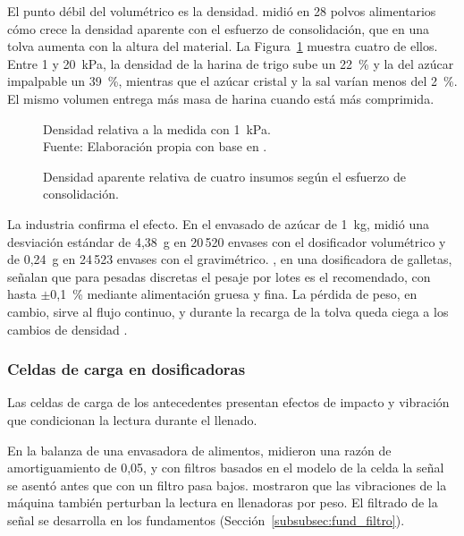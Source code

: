 El punto débil del volumétrico es la densidad.
\textcite{lanzerstorfer2020density} midió en 28 polvos alimentarios cómo crece
la densidad aparente con el esfuerzo de consolidación, que en una tolva
aumenta con la altura del material. La Figura~\ref{fig:densidad_esfuerzo}
muestra cuatro de ellos. Entre 1 y 20~kPa, la densidad de la harina de trigo
sube un 22~\% y la del azúcar impalpable un 39~\%, mientras que el azúcar
cristal y la sal varían menos del 2~\%. El mismo volumen entrega más masa de
harina cuando está más comprimida.

\begin{figure}[H]
    \centering
    \resizebox{0.75\textwidth}{!}{}
    \caption{Densidad aparente relativa de cuatro insumos según el esfuerzo de consolidación.}
    \label{fig:densidad_esfuerzo}
    \vspace{0.2em}
    {\footnotesize Densidad relativa a la medida con 1~kPa.\\
    Fuente: Elaboración propia con base en \textcite{lanzerstorfer2020density}.}
\end{figure}

La industria confirma el efecto. En el envasado de azúcar de 1~kg,
\textcite{acuna2024gravimetrico} midió una desviación estándar de 4,38~g en
20\,520 envases con el dosificador volumétrico y de 0,24~g en 24\,523 envases
con el gravimétrico.
\textcite{chiliguana2016rediseno}, en una dosificadora de galletas, señalan que
para pesadas discretas el pesaje por lotes es el recomendado, con hasta
$\pm$0,1~\% mediante alimentación gruesa y fina. La pérdida de peso, en cambio, sirve al flujo continuo, y
durante la recarga de la tolva queda ciega a los cambios de densidad
\parencite{blackshields2018continuous}.

\subsubsection{Celdas de carga en dosificadoras}
\label{subsec:medicion_celdas}

Las celdas de carga de los antecedentes presentan efectos de impacto y
vibración que condicionan la lectura durante el llenado.

En la balanza de una envasadora de alimentos, \textcite{richiedei2018shaper}
midieron una razón de amortiguamiento de 0,05, y con filtros basados en el
modelo de la celda la señal se asentó antes que con un filtro pasa bajos.
\textcite{tiboni2020vibrations} mostraron que las vibraciones de la máquina
también perturban la lectura en llenadoras por peso. El filtrado de la señal
se desarrolla en los fundamentos (Sección~\ref{subsubsec:fund_filtro}).

